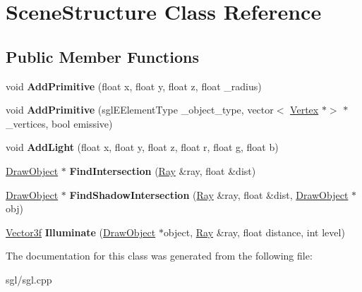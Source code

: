 \hypertarget{class_scene_structure}{}\section{Scene\+Structure Class Reference}
\label{class_scene_structure}
\subsection*{Public Member Functions}
\begin{DoxyCompactItemize}
\item 
\mbox{\label{class_scene_structure_ad07922a4fce33965a58d734b0012cfae}} 
void {\bfseries Add\+Primitive} (float x, float y, float z, float \+\_\+radius)
\item 
\mbox{\label{class_scene_structure_aa2e30b5b1a0a2681de75734ad7a3f1b7}} 
void {\bfseries Add\+Primitive} (sgl\+E\+Element\+Type \+\_\+object\+\_\+type, vector$<$ \hyperlink{class_vertex}{Vertex} $\ast$$>$ $\ast$\+\_\+vertices, bool emissive)
\item 
\mbox{\label{class_scene_structure_aa7c8ce8bb44a06f0f02801abde3eecfc}} 
void {\bfseries Add\+Light} (float x, float y, float z, float r, float g, float b)
\item 
\mbox{\label{class_scene_structure_a8a98d6e4d0f7f33297e6c6f173c2cece}} 
\hyperlink{class_draw_object}{Draw\+Object} $\ast$ {\bfseries Find\+Intersection} (\hyperlink{class_ray}{Ray} \&ray, float \&dist)
\item 
\mbox{\label{class_scene_structure_a072429ad6386e5f8879727b0f0734a39}} 
\hyperlink{class_draw_object}{Draw\+Object} $\ast$ {\bfseries Find\+Shadow\+Intersection} (\hyperlink{class_ray}{Ray} \&ray, float \&dist, \hyperlink{class_draw_object}{Draw\+Object} $\ast$obj)
\item 
\mbox{\label{class_scene_structure_ab1119698dc99ceb6b73c5fbe6efc5afe}} 
\hyperlink{class_vector3f}{Vector3f} {\bfseries Illuminate} (\hyperlink{class_draw_object}{Draw\+Object} $\ast$object, \hyperlink{class_ray}{Ray} \&ray, float distance, int level)
\end{DoxyCompactItemize}


The documentation for this class was generated from the following file\+:\begin{DoxyCompactItemize}
\item 
sgl/sgl.\+cpp\end{DoxyCompactItemize}
